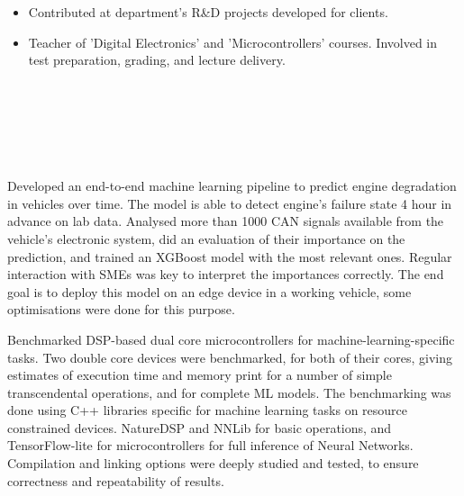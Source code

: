 \documentclass[10pt,a4paper,ragged2e,withhyper]{altacv}
\begin{document}
\begin{paracol}{2}
\begin{itemize}
    \item Contributed at department's R\&D projects developed for clients.

    \item Teacher of 'Digital Electronics' and 'Microcontrollers' courses. Involved in test preparation, grading, and lecture delivery.

    
\end{itemize}




\\
\\

\medskip

\\
\\





\newpage



Developed an end-to-end machine learning pipeline to predict engine degradation in vehicles over time. The model is able to detect engine's failure state 4 hour in advance on lab data. Analysed more than 1000 CAN signals available from the vehicle's electronic system, did an evaluation of their importance on the prediction, and trained an XGBoost model with the most relevant ones. Regular interaction with SMEs was key to interpret the importances correctly. The end goal is to deploy this model on an edge device in a working vehicle, some optimisations were done for this purpose.


\bigskip


Benchmarked DSP-based dual core microcontrollers for machine-learning-specific tasks. Two double core devices were benchmarked, for both of their cores, giving estimates of execution time and memory print for a number of simple transcendental operations, and for complete ML models. The benchmarking was done using C++ libraries specific for machine learning tasks on resource constrained devices. NatureDSP and NNLib for basic operations, and TensorFlow-lite for microcontrollers for full inference of Neural Networks. Compilation and linking options were deeply studied and tested, to ensure correctness and repeatability of results.


\end{paracol}
\end{document}

